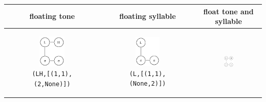\documentclass[11pt,letterpaper]{article}
\begin{document}
\begin{table}[H]
\begin{tabular}{ c|c|c} %
\hline
\textbf{floating tone} &	\textbf{floating syllable} &	\textbf{float tone and syllable} \\ \hline
	\begin{subfigure}{0.29\textwidth}
		\centering
		\includegraphics[width=0.52\textwidth]{figs/LH}			\caption{\texttt{(LH,[(1,1),(2,None)])}}	
		\label{floattone}
	\end{subfigure} & 
	\begin{subfigure}{0.29\textwidth}
		\centering
		\includegraphics[width=0.52\textwidth]{figs/L}
		\caption{\texttt{(L,[(1,1),(None,2)])}}
		\label{floatsyl}			
	\end{subfigure} &
	\begin{subfigure}{0.33\textwidth}
		\centering
		\includegraphics[width=0.49\textwidth]{figs/float}

\end{subfigure}
\end{tabular}
\end{table}
\end{document}

